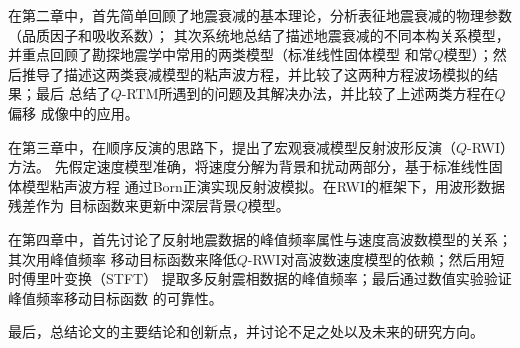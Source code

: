 在第二章中，首先简单回顾了地震衰减的基本理论，分析表征地震衰减的物理参数（品质因子和吸收系数）；
其次系统地总结了描述地震衰减的不同本构关系模型，并重点回顾了勘探地震学中常用的两类模型（标准线性固体模型
和常$Q$模型）；然后推导了描述这两类衰减模型的粘声波方程，并比较了这两种方程波场模拟的结果；最后
总结了$Q$-RTM所遇到的问题及其解决办法，并比较了上述两类方程在$Q$偏移
成像中的应用。

在第三章中，在顺序反演的思路下，提出了宏观衰减模型反射波形反演（$Q$-RWI）方法。
先假定速度模型准确，将速度分解为背景和扰动两部分，基于标准线性固体模型粘声波方程
通过Born正演实现反射波模拟。在RWI的框架下，用波形数据残差作为
目标函数来更新中深层背景$Q$模型。

在第四章中，首先讨论了反射地震数据的峰值频率属性与速度高波数模型的关系；其次用峰值频率
移动目标函数来降低$Q$-RWI对高波数速度模型的依赖；然后用短时傅里叶变换（STFT）
提取多反射震相数据的峰值频率；最后通过数值实验验证峰值频率移动目标函数
的可靠性。


最后，总结论文的主要结论和创新点，并讨论不足之处以及未来的研究方向。

















